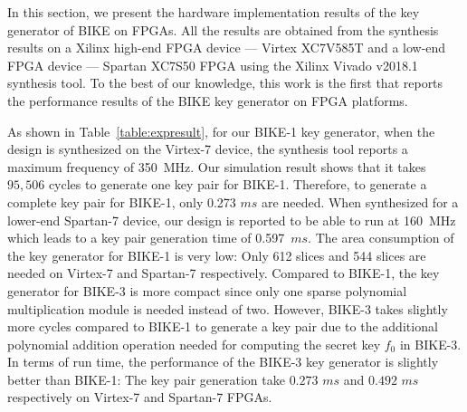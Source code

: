 \documentclass[runningheads]{llncs}
\begin{document}
%
In this section, we present the hardware implementation results of the
key generator of BIKE on FPGAs.
All the results are obtained from the synthesis results on a
Xilinx high-end FPGA device --- Virtex XC7V585T
and a low-end FPGA device --- Spartan XC7S50 FPGA
using the Xilinx Vivado v2018.1 synthesis tool.
To the best of our knowledge, this work is the first
that reports the performance results of the BIKE key generator
on FPGA platforms.

As shown in Table~\ref{table:expresult},
for our BIKE-1 key generator,
when the design is synthesized on the Virtex-7 device,
the synthesis tool reports a maximum frequency of 350~MHz.
Our simulation result shows that it takes $95,506$ cycles
to generate one key pair for BIKE-1.
Therefore, to generate a complete key pair for BIKE-1,
only 0.273 $ms$ are needed.
When synthesized for a lower-end Spartan-7 device,
our design is reported to be able to run at 160~MHz
which leads to a key pair generation time of 0.597~$ms$.
The area consumption of the key generator
for BIKE-1 is very low: Only 612 slices and 544 slices
are needed on Virtex-7 and Spartan-7 respectively.
Compared to BIKE-1, the key generator for BIKE-3
is more compact since only one sparse polynomial
multiplication module is needed instead of two.
However, BIKE-3 takes slightly more cycles
compared to BIKE-1 to generate a key pair
due to the additional polynomial addition operation
needed for computing the secret key $f_0$
in BIKE-3.
In terms of run time,
the performance of the BIKE-3 key generator
is slightly better than BIKE-1:
The key pair generation take $0.273$ $ms$ and $0.492$ $ms$
respectively on Virtex-7 and Spartan-7 FPGAs.
\end{document}
